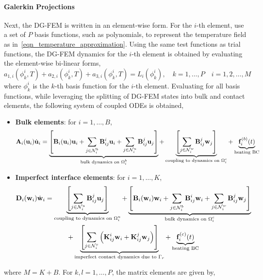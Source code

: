 \paragraph*{Galerkin Projections} Next, the DG-FEM is written in an element-wise form. For the $i$-th element, use a set of $P$ basis functions, such as polynomials, to represent the temperature field as in~\cref{eqn_temperature_approximation}. Using the same test functions as trial functions, the DG-FEM dynamics for the $i$-th element is obtained by evaluating the element-wise bi-linear forms,
\begin{equation}
    a_{1,i}(\phi_k^i,T) + a_{2,i}(\phi_k^i,T) + a_{3,i}(\phi_k^i,T) = L_i(\phi_k^i),\quad k=1,\ldots,P\quad i=1,2,\dots,M
\end{equation}
where $\phi_k^i$ is the $k$-th basis function for the $i$-th element. Evaluating for all basis functions, while leveraging the splitting of DG-FEM states into bulk and contact elements, the following system of coupled ODEs is obtained,
\begin{itemize}
    \item \textbf{Bulk elements}: for $i=1,\dots,B$,
    \begin{equation}
        \mathbf{A}_i(\mathbf{u}_i)\dot{\mathbf{u}}_i = \underbrace{\left[\mathbf{B}_i(\mathbf{u}_i)\mathbf{u}_i + \sum_{j\in\mathcal{N}^{b}_i}\mathbf{B}_{ij}^{i}\mathbf{u}_i + \sum_{j\in\mathcal{N}_i^u}\mathbf{B}_{ij}^{j}\mathbf{u}_j\right]}_{\text{bulk dynamics on $\Omega_i^b$}} + \underbrace{\left[\sum_{j\in\mathcal{N}_i^w}\mathbf{B}_{ij}^{j}\mathbf{w}_j\right]}_{\text{coupling to dynamics on $\Omega_i^c$}} + \underbrace{\mathbf{f}_i^{(b)}(t)}_{\text{heating BC}}\label{eqn_bulk_odes}
    \end{equation}
    \item \textbf{Imperfect interface elements}: for $i=1,\dots,K$,
    \begin{gather}
        \mathbf{D}_i(\mathbf{w}_i)\dot{\mathbf{w}}_i = \underbrace{\left[\sum_{j\in\mathcal{N}_i^u}\mathbf{B}_{ij}^{j}\mathbf{u}_j\right]}_{\text{coupling to dynamics on $\Omega_i^u$}} + \underbrace{\left[\mathbf{B}_i(\mathbf{w}_i)\mathbf{w}_i + \sum_{j\in\mathcal{N}_i^b}\mathbf{B}_{ij}^{i}\mathbf{w}_i + \sum_{j\in\mathcal{N}_i^w}\mathbf{B}_{ij}^{j}\mathbf{w}_j\right]}_{\text{bulk dynamics on $\Omega_i^c$}}\notag\\
        + \underbrace{\left[\sum_{j\in\mathcal{N}_{i}^{c}}\left(\mathbf{K}_{ij}^{i}\mathbf{w}_i + \mathbf{K}_{ij}^{j}\mathbf{w}_j\right)\right]}_{\text{imperfect contact dynamics due to $\Gamma_r$}} + \underbrace{\mathbf{f}_i^{(c)}(t)}_{\text{heating BC}}\label{eqn_contact_odes}
    \end{gather}
\end{itemize}
where $M=K+B$. For $k,l=1,\dots,P$, the matrix elements are given by,
